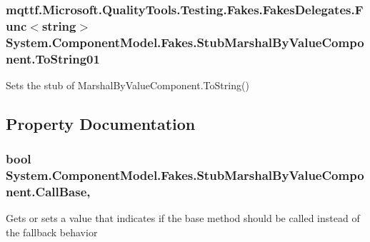 \hypertarget{class_system_1_1_component_model_1_1_fakes_1_1_stub_marshal_by_value_component_aabc48fc5d4189d60f95879e01832d63e}{
\subsubsection[{To\-String01}]{\setlength{\rightskip}{0pt plus 5cm}mqttf.\-Microsoft.\-Quality\-Tools.\-Testing.\-Fakes.\-Fakes\-Delegates.\-Func$<$string$>$ System.\-Component\-Model.\-Fakes.\-Stub\-Marshal\-By\-Value\-Component.\-To\-String01}}\label{class_system_1_1_component_model_1_1_fakes_1_1_stub_marshal_by_value_component_aabc48fc5d4189d60f95879e01832d63e}


Sets the stub of Marshal\-By\-Value\-Component.\-To\-String()



\subsection{Property Documentation}
\hypertarget{class_system_1_1_component_model_1_1_fakes_1_1_stub_marshal_by_value_component_ac83e2fc01ea319426d8cde021179d159}{
\subsubsection[{Call\-Base}]{\setlength{\rightskip}{0pt plus 5cm}bool System.\-Component\-Model.\-Fakes.\-Stub\-Marshal\-By\-Value\-Component.\-Call\-Base\hspace{0.3cm}{\ttfamily [get]}, {\ttfamily [set]}}}\label{class_system_1_1_component_model_1_1_fakes_1_1_stub_marshal_by_value_component_ac83e2fc01ea319426d8cde021179d159}


Gets or sets a value that indicates if the base method should be called instead of the fallback behavior

